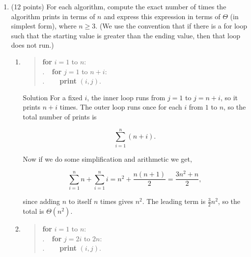 \documentclass[10pt,letterpaper,unboxed,cm]{article}
\newcommand{\ind}{$~~~~~$}
\begin{document}
\begin{enumerate}
\begin{enumerate}
\begin{frame}{Solution}
    In pass \(r\), there are \(\frac{n}{2^r}\) merges, and each one produces a list of size \(2^r\). Since MERGE costs the size of the list it produces, each pass costs
    
    \[\frac{n}{2^r} * 2^r = n.\]

    Each pass cuts the number of lists in half, starting at \(n\) and ending at 1, so there are \(\log_2 n\) passes. So the total runtime is
    
    \[n * \log_2 n,\]
    which is \(O(n \log n)\).

    Since \(\frac{n \log n}{n^2} = \frac{\log n}{n}\), and this goes to 0 as \(n\) approaches infinity, the runtime grows strictly slower than \(n^2\). So \(O(n^2)\) is not a tight bound.    
    
\end{frame}

\end{enumerate}




\item (12 points)
For each algorithm, compute the exact number of times the algorithm prints in terms of $n$ and express this expression in terms of $\Theta$ (in simplest form), where $n \geq 3$. (We use the convention that if there is a for loop such that the starting value is greater than the ending value, then that loop does not run.)

\begin{enumerate}

\item
\begin{quote}
{\bf for} $i=1$ to $n$:\\
.\ind{\bf for} $j=1$ to $n+i$:\\
.\ind\ind {\bf print} $(i,j)$.
\end{quote}
\begin{frame}{Solution}
For a fixed \(i\), the inner loop runs from \(j = 1\) to \(j = n+i\), so it prints \(n+i\) times. The outer loop runs once for each \(i\) from \(1\) to \(n\), so the total number of prints is

\[\sum_{i=1}^{n} (n+i).\]

Now if we do some simplification and arithmetic we get, 

\[\sum_{i=1}^{n} n + \sum_{i=1}^{n} i = n^2 + \frac{n(n+1)}{2} = \frac{3n^2+n}{2},\]

since adding \(n\) to itself \(n\) times gives \(n^2\). The leading term is \(\frac{3}{2}n^2\), so the total is \(\Theta(n^2)\).
\end{frame}
\item
\begin{quote}
{\bf for} $i=1$ to $n$:\\
.\ind{\bf for} $j=2i$ to $2n$:\\
.\ind\ind {\bf print} $(i,j)$.
\end{quote}


\end{enumerate}
\end{enumerate}
\end{document}
